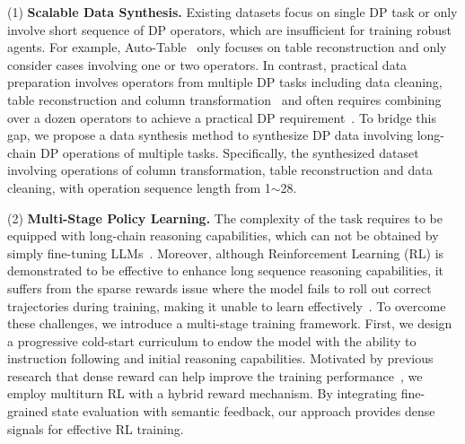 (1) \textbf{Scalable Data Synthesis.} Existing datasets focus on single DP task or only involve short sequence of DP operators, which are insufficient for training robust agents. For example, Auto-Table~\cite{DBLP:journals/pvldb/LiHYWC23} only focuses on table reconstruction and only consider cases involving one or two operators. In contrast, practical data preparation involves operators from {multiple DP tasks} including data cleaning, table reconstruction and column transformation~\cite{heer2015predictive} and often requires combining over {a dozen operators} to achieve a practical DP requirement~\cite{2011-wrangler}.
To bridge this gap, we propose a data synthesis method to synthesize DP data involving long-chain DP operations of multiple tasks. 
Specifically, the synthesized dataset involving operations of column transformation, table reconstruction and data cleaning, with operation sequence length from 1$\sim$28.


(2) \textbf{Multi-Stage Policy Learning.} The complexity of the task requires \sys to be equipped with long-chain reasoning capabilities, which can not be obtained by simply fine-tuning LLMs~\cite{xie2025logic}. Moreover, although Reinforcement Learning (RL) is demonstrated to be effective to enhance long sequence reasoning capabilities, it suffers from the {sparse rewards} issue where the model fails to roll out correct trajectories during training, making it unable to learn effectively~\cite{gao2024designing}.
To overcome these challenges, we introduce a multi-stage training framework.
First, we design a {progressive cold-start curriculum} to endow the model with the ability to instruction following and initial reasoning capabilities.
Motivated by previous research that dense reward can help improve the training performance~\cite{gao2024designing}, we employ {multiturn RL with a hybrid reward mechanism}. By integrating fine-grained state evaluation with semantic feedback, our approach provides dense signals for effective RL training.

